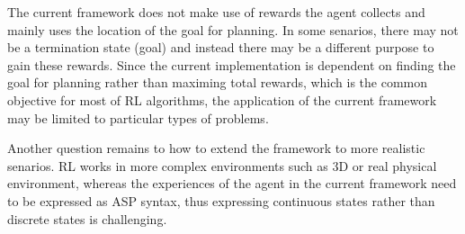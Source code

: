 The current framework does not make use of rewards the agent collects and mainly uses the location of the goal for planning.
In some senarios, there may not be a termination state (goal) and instead there may be a different purpose to gain these rewards. 
Since the current implementation is dependent on finding the goal for planning rather than maximing total rewards, which is the common objective for most of RL algorithms,
the application of the current framework may be limited to particular types of problems.

Another question remains to how to extend the framework to more realistic senarios. RL works in more complex environments such as 3D or real physical environment, 
whereas the experiences of the agent in the current framework need to be expressed as ASP syntax, thus expressing continuous states rather than discrete states is challenging.